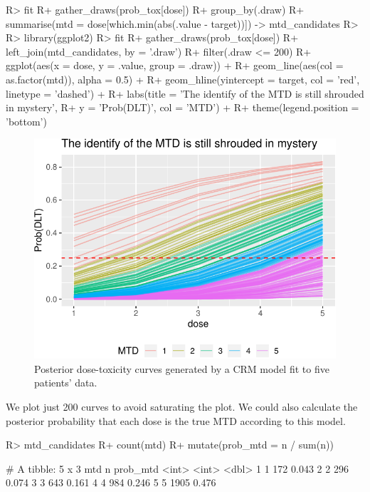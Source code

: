 \documentclass[article]{jss}
\begin{document}
\begin{CodeChunk}

\begin{CodeInput}
R> fit %
R+   gather_draws(prob_tox[dose]) %
R+   group_by(.draw) %
R+   summarise(mtd = dose[which.min(abs(.value - target))]) -> mtd_candidates
R> 
R> library(ggplot2)
R> fit %
R+   gather_draws(prob_tox[dose]) %
R+   left_join(mtd_candidates, by = '.draw') %
R+   filter(.draw <= 200) %
R+   ggplot(aes(x = dose, y = .value, group = .draw)) +
R+   geom_line(aes(col = as.factor(mtd)), alpha = 0.5) + 
R+   geom_hline(yintercept = target, col = 'red', linetype = 'dashed') + 
R+   labs(title = 'The identify of the MTD is still shrouded in mystery', 
R+        y = 'Prob(DLT)', col = 'MTD') +
R+   theme(legend.position = 'bottom')
\end{CodeInput}
\begin{figure}

{\centering \includegraphics{trialr_files/figure-latex/unnamed-chunk-3-1} 

}

\caption[Posterior dose-toxicity curves generated by a CRM model fit to five patients' data]{Posterior dose-toxicity curves generated by a CRM model fit to five patients' data.}\label{fig:unnamed-chunk-3}
\end{figure}
\end{CodeChunk}

We plot just 200 curves to avoid saturating the plot. We could also
calculate the posterior probability that each dose is the true MTD
according to this model.

\begin{CodeChunk}

\begin{CodeInput}
R> mtd_candidates %
R+   count(mtd) %
R+   mutate(prob_mtd = n / sum(n))
\end{CodeInput}

\begin{CodeOutput}
# A tibble: 5 x 3
    mtd     n prob_mtd
  <int> <int>    <dbl>
1     1   172    0.043
2     2   296    0.074
3     3   643    0.161
4     4   984    0.246
5     5  1905    0.476
\end{CodeOutput}
\end{CodeChunk}
\end{document}
